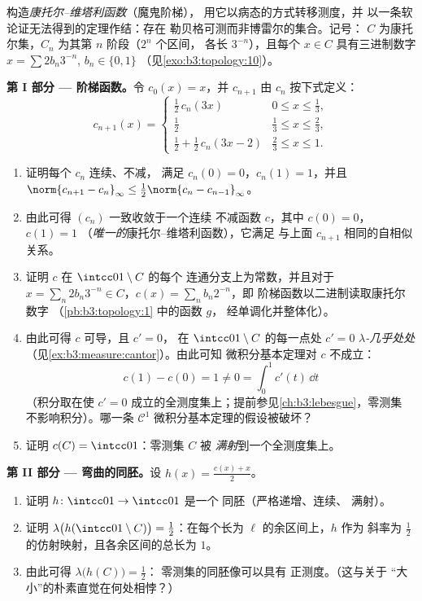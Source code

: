\begin{problem}
\label{pb:b3:measure:1}
构造\emph{康托尔–维塔利函数}（魔鬼阶梯），
用它以病态的方式转移测度，并
以一条软论证无法得到的定理作结：存在
勒贝格可测而非博雷尔的集合。记号：
$C$ 为康托尔集，$C_n$ 为其第 $n$ 阶段（$2^n$ 个区间，
各长 $3^{-n}$），且每个 $x \in C$ 具有三进制数字
$x = \sum 2b_n3^{-n}$, $b_n \in \{0,1\}$
（见\cref{exo:b3:topology:10}）。

\medskip
\noindent\textbf{第 I 部分 --- 阶梯函数。}令 $c_0(x) = x$，并
$c_{n+1}$ 由 $c_n$ 按下式定义：
\[
c_{n+1}(x) = \begin{cases}
\tfrac12\,c_n(3x) & 0 \leq x \leq \tfrac13,\\[2pt]
\tfrac12 & \tfrac13 \leq x \leq \tfrac23,\\[2pt]
\tfrac12 + \tfrac12\,c_n(3x - 2) & \tfrac23 \leq x \leq 1.
\end{cases}
\]
\begin{enumerate}
  \item 证明每个 $c_n$ 连续、不减，
        满足 $c_n(0) = 0$，$c_n(1) = 1$，并且
        $\norm{c_{n+1} - c_n}_\infty \leq
        \tfrac12\norm{c_n - c_{n-1}}_\infty$。
  \item 由此可得 $(c_n)$ 一致收敛于一个连续
        不减函数 $c$，其中 $c(0) = 0$，$c(1) = 1$
        （\emph{唯一的}康托尔–维塔利函数），它满足
        与上面 $c_{n+1}$ 相同的自相似关系。
  \item 证明 $c$ 在 $\intcc01\setminus C$ 的每个
        连通分支上为常数，并且对于 $x = \sum_n
        2b_n3^{-n} \in C$，$c(x) = \sum_n b_n2^{-n}$，即
        阶梯函数以二进制读取康托尔数字
        （\cref{pb:b3:topology:1} 中的函数 $g$，
        经单调化并整体化）。
  \item 由此可得 $c$ 可导，且 $c' = 0$，
        在 $\intcc01\setminus C$ 的每一点处 $c' = 0$
        \emph{$\lambda$-几乎处处}
        （见\cref{ex:b3:measure:cantor}）。由此可知
        微积分基本定理对 $c$ 不成立：
        \[
        c(1) - c(0) = 1 \neq 0 = \int_0^1 c'(t)\,\dd t
        \]
        （积分取在使
        $c' = 0$ 成立的全测度集上；提前参见\cref{ch:b3:lebesgue}，零测集
        不影响积分）。哪一条
        $\mathcal C^1$ 微积分基本定理的假设被破坏？
  \item 证明 $c(C) = \intcc01$：零测集 $C$ 被
        \emph{满射}到一个全测度集上。
\end{enumerate}

\medskip
\noindent\textbf{第 II 部分 --- 弯曲的同胚。}设
$h(x) = \frac{c(x) + x}{2}$。
\begin{enumerate}[resume]
  \item 证明 $h \colon \intcc01 \to \intcc01$ 是一个
        同胚（严格递增、连续、
        满射）。
  \item 证明 $\lambda\bigl(h(\intcc01\setminus C)\bigr) =
        \tfrac12$：在每个长为 $\ell$ 的余区间上，$h$ 作为
        斜率为 $\tfrac12$ 的仿射映射，且各余区间的总长为
        $1$。
  \item 由此可得 $\lambda\bigl(h(C)\bigr) = \tfrac12$：
        零测集的同胚像可以具有
        正测度。（这与关于
        “大小”的朴素直觉在何处相悖？）
\end{enumerate}


\end{problem}
